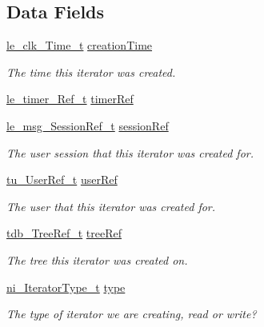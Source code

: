 \subsection*{Data Fields}
\begin{DoxyCompactItemize}
\item 
\hyperlink{structle__clk___time__t}{le\+\_\+clk\+\_\+\+Time\+\_\+t} \hyperlink{struct_iterator__t_af6263176bfff7465debdc9c15172144e}{creation\+Time}
\begin{DoxyCompactList}\small\item\em The time this iterator was created. \end{DoxyCompactList}\item 
\hyperlink{le__timer_8h_a763fa6992488cdce3b5a820817094838}{le\+\_\+timer\+\_\+\+Ref\+\_\+t} \hyperlink{struct_iterator__t_a08481e2c867b158b42083d83647dbcd8}{timer\+Ref}
\item 
\hyperlink{le__messaging_8h_aebfc01e15b430a5b4f3038a5bd518904}{le\+\_\+msg\+\_\+\+Session\+Ref\+\_\+t} \hyperlink{struct_iterator__t_a69f75e545f293eb4cba0ad42a7a8b00f}{session\+Ref}
\begin{DoxyCompactList}\small\item\em The user session that this iterator was created for. \end{DoxyCompactList}\item 
\hyperlink{tree_user_8h_ae16174a0d43f8a46e47447be76fe951a}{tu\+\_\+\+User\+Ref\+\_\+t} \hyperlink{struct_iterator__t_a5d5da27f6b619365c158b865c0384a96}{user\+Ref}
\begin{DoxyCompactList}\small\item\em The user that this iterator was created for. \end{DoxyCompactList}\item 
\hyperlink{tree_db_8h_aa4d033a6e03f068d0e99455012b060c3}{tdb\+\_\+\+Tree\+Ref\+\_\+t} \hyperlink{struct_iterator__t_ae0c06bda7f98273df1c8cf652c85335d}{tree\+Ref}
\begin{DoxyCompactList}\small\item\em The tree this iterator was created on. \end{DoxyCompactList}\item 
\hyperlink{node_iterator_8h_aade2d335919a07a9cdb0a892d363528f}{ni\+\_\+\+Iterator\+Type\+\_\+t} \hyperlink{struct_iterator__t_a4daa7b32dfc42c0a622fd24a16672225}{type}
\begin{DoxyCompactList}\small\item\em The type of iterator we are creating, read or write? \end{DoxyCompactList}\item 

\end{DoxyCompactItemize}
